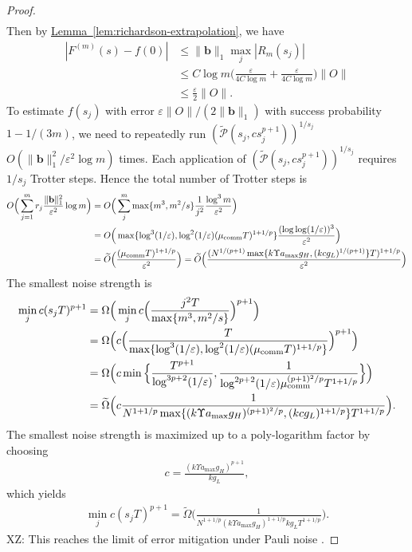 \documentclass[11pt]{article}
\newcommand{\lem}[1]{\hyperref[lem:#1]{Lemma~\ref*{lem:#1}}}
\newcommand{\eps}{\varepsilon}
\newcommand{\mc}{\mathcal}
\newcommand{\xz}[1]{{\color{cyan} XZ: #1}}
\begin{document}
\begin{proof}
\begin{align*}
    \end{align*}
    Then by \lem{richardson-extrapolation}, we have \begin{align*}
        |F^{(m)}(s)-f(0)|&\le \|\mathbf{b}\|_1 \max_j|R_m(s_j)| \\
        &\le C\log m\Big(\frac{\eps}{4C\log m}+\frac{\eps}{4C\log m}\Big)\|O\|\\
        &\le \frac{\eps }{2}\|O\|.
    \end{align*}
    To estimate $f(s_j)$ with error $\eps\|O\|/(2\|\mathbf{b}\|_1)$ with success probability $1-1/(3m)$, we need to repeatedly run $(\tilde{\mc P}(s_j, cs_j^{p+1}))^{1/s_j}$ $O(\|\mathbf{b}\|_1^2/\eps^2\log m)$ times.  Each application of $(\tilde{\mc P}(s_j, cs_j^{p+1}))^{1/s_j}$ requires $1/s_j$ Trotter steps. Hence the total number of Trotter steps is \begin{align*}
        O\Big(\sum_{j=1}^m r_j\frac{\|\mathbf{b}\|_1^2}{\eps^2}\log m\Big) & = O\Big(\sum_j^{m} \max\{m^3, m^2/s\}\frac{1}{j^2}\frac{\log^3 m}{\eps^2}\Big)\\
        &=O\Big( \max\{\log^3(1/\eps), \log^2(1/\eps)(\mu_{\rm comm}T)^{1+1/p}\}\frac{(\log\log (1/\eps))^3}{\eps^2}\Big) \\
        &= \widetilde{O}\Big(\frac{(\mu_{\rm comm}T)^{1+1/p}}{\eps^2}\Big)=\widetilde{O}\Big(\frac{( N^{1/(p+1)}\max\{k\Upsilon a_{\max}g_H, (kcg_L)^{1/(p+1)}\}T)^{1+1/p}}{\eps^2}\Big)
    \end{align*}
    The smallest noise strength is \begin{align*}
        \min_{j}c(s_jT)^{p+1} &= \Omega\Big(\min_{j}c\Big(\frac{j^2T}{\max\{m^3, m^2/s\}}\Big)^{p+1}\Big) \\
        &= \Omega\Big(c\Big(\frac{T}{\max\{\log^3(1/\eps), \log^2(1/\eps)(\mu_{\rm comm}T)^{1+1/p}\}}\Big)^{p+1}\Big) \\
        &=\Omega\Big(c\min\Big\{\frac{T^{p+1}}{\log^{3p+2}(1/\eps)}, \frac{1}{\log^{2p+2}(1/\eps)\mu_{\rm comm}^{(p+1)^2/p} T^{1+1/p}}\Big\}\Big) \\
        &=\widetilde{\Omega}\Big(c \frac{1}{ N^{1+1/p} \max\{(k\Upsilon a_{\max}g_H)^{(p+1)^2/p}, (kcg_L)^{1+1/p}\} T^{1+1/p}}\Big).
    \end{align*}
    The smallest noise strength is maximized up to a poly-logarithm factor by choosing \begin{align*}
        c = \frac{(k\Upsilon a_{\max}g_H)^{p+1}}{kg_L}, 
    \end{align*}
    which yields \begin{align*}
        \min_{j}c(s_jT)^{p+1} = \widetilde{\Omega}\Big(\frac{1}{ N^{1+1/p} (k\Upsilon a_{\max}g_H)^{1+1/p} kg_L T^{1+1/p}}\Big).
    \end{align*}
    \xz{This reaches the limit of error mitigation under Pauli noise \cite{wang2021noise, cai2021multi}.}
\end{proof}
\end{document}

